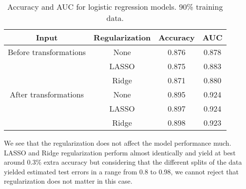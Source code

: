 \documentclass[../../project.tex]{subfiles}
\begin{document}
	\begin{table}[h!]
		\centering
		\begin{tabular}{cccc}
			Input & Regularization & Accuracy & AUC \\
			\midrule
			Before transformations & None & 0.876 & 0.878 \\
			& LASSO & 0.875 & 0.883 \\
			& Ridge & 0.871 & 0.880 \\
			\midrule
			After transformations & None & 0.895 & 0.924 \\
			& LASSO & 0.897 & 0.924 \\
			& Ridge & 0.898 & 0.923 \\
		\end{tabular}
		\caption{Accuracy and AUC for logistic regression models. 90\% training data.}
		\label{tab:logreg_table_90}
	\end{table}
	
	We see that the regularization does not affect the model performance much. LASSO and Ridge regularization perform almost identically and yield at best around 0.3\% extra accuracy but considering that the different splits of the data yielded estimated test errors in a range from 0.8 to 0.98, we cannot reject that regularization does not matter in this case.
\end{document}
